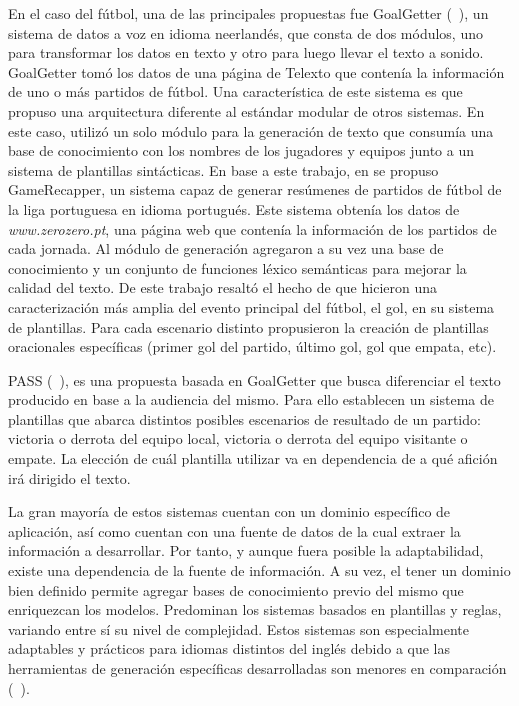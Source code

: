 En el caso del fútbol, una de las principales propuestas fue GoalGetter (~\cite{theune2001data}), un sistema de datos a voz en idioma neerlandés, que consta de dos módulos, uno para transformar los datos en texto y 
otro para luego llevar el texto a sonido. GoalGetter tomó los datos de una página de Telexto que contenía la información de uno o más partidos de fútbol. Una característica de este sistema es que propuso una arquitectura diferente al 
estándar modular de otros sistemas. En este caso, utilizó un solo módulo para la generación de texto que consumía una base de conocimiento con los nombres de los jugadores y equipos junto a un sistema de plantillas sintácticas.
En base a este trabajo, en \cite{aires2016automatic} se propuso GameRecapper, un sistema capaz de generar resúmenes de partidos de fútbol de la liga portuguesa en idioma portugués. Este sistema obtenía los datos de \textit{www.zerozero.pt},
una página web que contenía la información de los partidos de cada jornada. Al módulo de generación agregaron a su vez una base de conocimiento y un conjunto de funciones léxico semánticas para mejorar la calidad del texto. De este trabajo resaltó el hecho 
de que hicieron una caracterización más amplia del evento principal del fútbol, el gol, en su sistema de plantillas. Para cada escenario distinto propusieron la creación de plantillas oracionales específicas (primer gol del partido, último gol, gol que empata, etc).

PASS (~\cite{van2017pass}), es una propuesta basada en GoalGetter que busca diferenciar el texto producido en base a la audiencia del mismo. Para ello establecen un sistema de plantillas que abarca distintos posibles escenarios de resultado de un partido: victoria o derrota 
del equipo local, victoria o derrota del equipo visitante o empate. La elección de cuál plantilla utilizar va en dependencia de a qué afición irá dirigido el texto.  

    La gran mayoría de estos sistemas cuentan con un dominio específico de aplicación, así como cuentan con una fuente de datos de la 
cual extraer la información a desarrollar. Por tanto, y aunque fuera posible la adaptabilidad, existe una dependencia de la fuente de información. A su vez, el tener un dominio bien definido  
permite agregar bases de conocimiento previo del mismo que enriquezcan los modelos. Predominan los sistemas basados en plantillas y reglas, variando entre sí su nivel de complejidad. Estos 
sistemas son especialmente adaptables y prácticos para idiomas distintos del inglés debido a que las herramientas de generación específicas desarrolladas son menores en comparación (~\cite{gunasiri2021automated}). 

